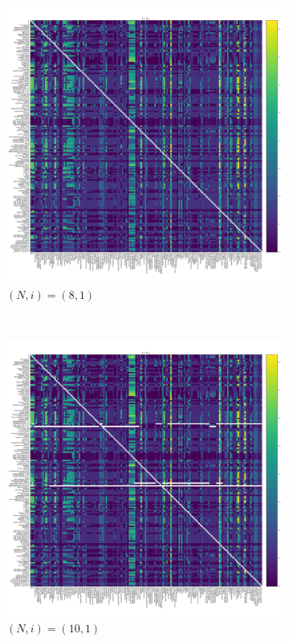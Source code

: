 \documentclass{article}
\begin{document}
\begin{figure}[!hbtp]
    \begin{subfigure}[t]{.3\textwidth}
        \centering
        \includegraphics[width=.8\textwidth]{../img/fixation_heatmap_8_invade.pdf}
        \caption{\((N,i)=(8, 1)\)}
    \end{subfigure}%
    ~
    \begin{subfigure}[t]{.3\textwidth}
        \centering
        \includegraphics[width=.8\textwidth]{../img/fixation_heatmap_10_invade.pdf}
        \caption{\((N,i)=(10, 1)\)}
    \end{subfigure}%
    ~
    \begin{subfigure}[t]{.3\textwidth}

\end{subfigure}
\end{figure}
\end{document}
